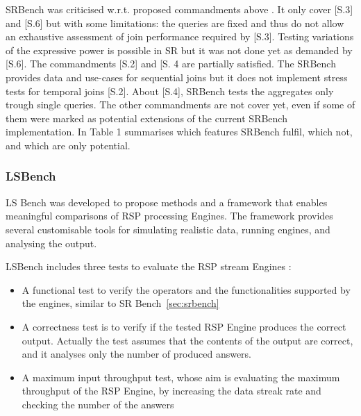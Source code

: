 SRBench was criticised w.r.t. proposed commandments above \cite{DBLP:conf/esws/ScharrenbachUMVB13}. It only cover [S.3] and [S.6] but with some limitations: the queries are fixed and thus do not allow an exhaustive assessment of join performance required by [S.3]. Testing variations of the expressive power is possible in SR but it was not done yet as demanded by [S.6]. The commandments [S.2] and [S.
4 are partially satisfied. The SRBench provides data and use-cases for sequential joins but it does not implement stress tests for temporal joins [S.2]. About [S.4], SRBench tests the aggregates only trough single queries. The other commandments are not cover yet, even if some of them were marked as potential extensions of the current SRBench implementation. In \cite{DBLP:conf/esws/ScharrenbachUMVB13} Table 1 summarises which features SRBench fulfil, which not, and which are only potential.

\subsubsection{LSBench}\label{sec:lsbench}

LS Bench was developed to propose methods and a framework that enables meaningful comparisons of RSP processing Engines. The framework provides several customisable tools for simulating realistic data, running engines, and analysing the output. 

LSBench includes three tests to evaluate the RSP stream Engines \cite{DBLP:conf/semweb/DellAglioCBCV13}:
\begin{itemize}
\item A functional test to verify the operators and the functionalities supported
by the engines, similar to SR Bench~\ref{sec:srbench}
\item A correctness test is to verify if the tested RSP Engine produces the correct output. Actually the test assumes that the contents of the output are correct, and it analyses only the number of produced answers.
\item A maximum input throughput test, whose aim is evaluating the maximum throughput of the RSP Engine, by increasing the data streak rate and checking the number of the answers
\end{itemize}

